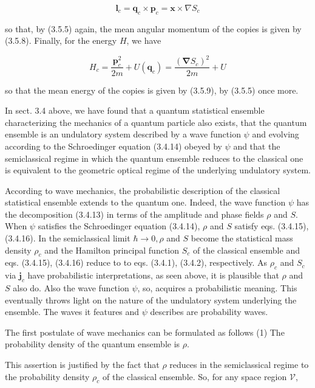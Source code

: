 \documentclass{article}
\begin{document}
\begin{equation*}
\boldsymbol{l}_{c}=\boldsymbol{q}_{c} \times \boldsymbol{p}_{c}=\boldsymbol{x} \times \nabla S_{c} \tag{3.5.15}
\end{equation*}
 
so that, by (3.5.5) again, the mean angular momentum of the copies is given by (3.5.8). Finally, for the energy $H$, we have
 
\begin{equation*}
H_{c}=\frac{\boldsymbol{p}_{c}^{2}}{2 m}+U\left(\boldsymbol{q}_{c}\right)=\frac{\left(\boldsymbol{\nabla} S_{c}\right)^{2}}{2 m}+U \tag{3.5.16}
\end{equation*}
 
so that the mean energy of the copies is given by (3.5.9), by (3.5.5) once more.

In sect. 3.4 above, we have found that a quantum statistical ensemble characterizing the mechanics of a quantum particle also exists, that the quantum ensemble is an undulatory system described by a wave function $\psi$ and evolving according to the Schroedinger equation (3.4.14) obeyed by $\psi$ and that the semiclassical regime in which the quantum ensemble reduces to the classical one is equivalent to the geometric optical regime of the underlying undulatory system.

According to wave mechanics, the probabilistic description of the classical
statistical ensemble extends to the quantum one. Indeed, the wave function $\psi$ has the decomposition (3.4.13) in terms of the amplitude and phase fields $\rho$ and $S$. When $\psi$ satisfies the Schroedinger equation (3.4.14), $\rho$ and $S$ satisfy eqs. (3.4.15), (3.4.16). In the semiclassical limit $\hbar \rightarrow 0, \rho$ and $S$ become the statistical mass density $\rho_{c}$ and the Hamilton principal function $S_{c}$ of the classical ensemble and eqs. (3.4.15), (3.4.16) reduce to to eqs. (3.4.1), (3.4.2), respectively. As $\rho_{c}$ and $S_{c}$ via $\boldsymbol{j}_{c}$ have probabilistic interpretations, as seen above, it is plausible that $\rho$ and $S$ also do. Also the wave function $\psi$, so, acquires a probabilistic meaning. This eventually throws light on the nature of the undulatory system underlying the ensemble. The waves it features and $\psi$ describes are probability waves.

The first postulate of wave mechanics can be formulated as follows
(1) The probability density of the quantum ensemble is $\rho$.

This assertion is justified by the fact that $\rho$ reduces in the semiclassical regime to the probability density $\rho_{c}$ of the classical ensemble. So, for any space region $\mathcal{V}$,
 
\end{document}
